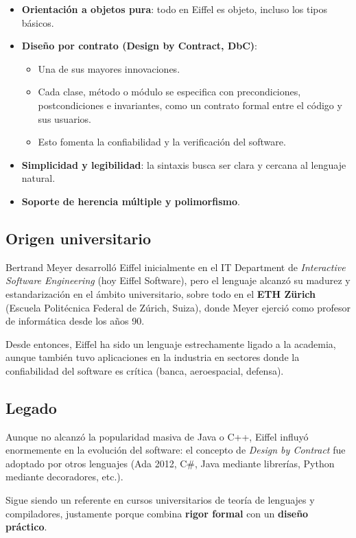 \documentclass[a4paper,12pt]{article}
\begin{document}
\begin{itemize}
    \item \textbf{Orientación a objetos pura}: todo en Eiffel es objeto,
          incluso los tipos básicos.
    \item \textbf{Diseño por contrato (Design by Contract, DbC)}:
          \begin{itemize}
              \item Una de sus mayores innovaciones.
              \item Cada clase, método o módulo se especifica con
                    precondiciones,
                    postcondiciones e invariantes, como un contrato formal
                    entre el código y sus
                    usuarios.
              \item Esto fomenta la confiabilidad y la verificación del
                    software.
          \end{itemize}
    \item \textbf{Simplicidad y legibilidad}: la sintaxis busca ser clara y
          cercana al lenguaje natural.
    \item \textbf{Soporte de herencia múltiple y polimorfismo}.
\end{itemize}

\subsection{Origen universitario}

Bertrand Meyer desarrolló Eiffel inicialmente en el IT Department de
\textit{Interactive Software Engineering} (hoy Eiffel Software), pero el
lenguaje alcanzó su madurez y estandarización en el ámbito universitario, sobre
todo en el \textbf{ETH Zürich} (Escuela Politécnica Federal de Zúrich, Suiza),
donde Meyer ejerció como profesor de informática desde los años 90.

\noindent
Desde entonces, Eiffel ha sido un lenguaje estrechamente ligado a la academia,
aunque también tuvo aplicaciones en la industria en sectores donde la
confiabilidad del software es crítica (banca, aeroespacial, defensa).

\subsection{Legado}

Aunque no alcanzó la popularidad masiva de Java o C++, Eiffel influyó
enormemente en la evolución del software: el concepto de \textit{Design by
    Contract} fue adoptado por otros lenguajes (Ada 2012, C\#, Java mediante
librerías, Python mediante decoradores, etc.).

\noindent
Sigue siendo un referente en cursos universitarios de teoría de lenguajes y
compiladores, justamente porque combina \textbf{rigor formal} con un
\textbf{diseño práctico}.
\end{document}
